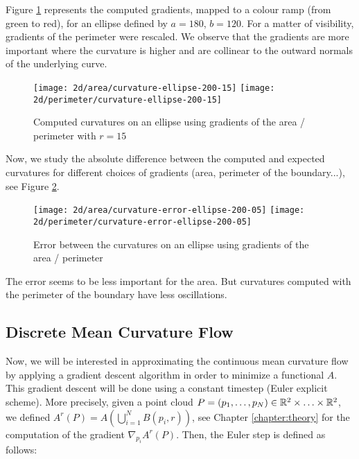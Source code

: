 Figure \ref{fig:2d-curvature-ellipse} represents the computed gradients, mapped
to a colour ramp (from green to red), for an ellipse defined by $ a = 180 $, $ b
= 120 $. For a matter of visibility, gradients of the perimeter were rescaled.
We observe that the gradients are more important where the curvature is higher
and are collinear to the outward normals of the underlying curve.

\begin{figure}[h]
    \centering

    \texttt{[image: 2d/area/curvature-ellipse-200-15]}
    \texttt{[image: 2d/perimeter/curvature-ellipse-200-15]}
    \caption{Computed curvatures on an ellipse using gradients of the area /
        perimeter with $ r = 15 $}
    \label{fig:2d-curvature-ellipse}
\end{figure}

Now, we study the absolute difference between the computed and expected
curvatures for different choices of gradients (area, perimeter of the
boundary...), see Figure \ref{fig:2d-curvature-error-ellipse}.

\begin{figure}[h]
    \centering

    \texttt{[image: 2d/area/curvature-error-ellipse-200-05]}
    \texttt{[image: 2d/perimeter/curvature-error-ellipse-200-05]}
    \caption{Error between the curvatures on an ellipse using gradients of the
        area / perimeter}
    \label{fig:2d-curvature-error-ellipse}
\end{figure}

The error seems to be less important for the area. But curvatures computed with
the perimeter of the boundary have less oscillations.

\subsection{Discrete Mean Curvature Flow}

Now, we will be interested in approximating the continuous mean curvature flow
by applying a gradient descent algorithm in order to minimize a functional $ A
$. This gradient descent will be done using a constant timestep (Euler explicit
scheme). More precisely, given a point cloud $ P = (p_1, \ldots, p_N) \in \mathbb{R}^2
\times \ldots \times \mathbb{R}^2 $, we defined $ A^r(P) = A(\bigcup_{i=1}^N B(p_i, r))
$, see Chapter \ref{chapter:theory} for the computation of the gradient $
\nabla_{p_i} A^r(P) $. Then, the Euler step is defined as follows:

